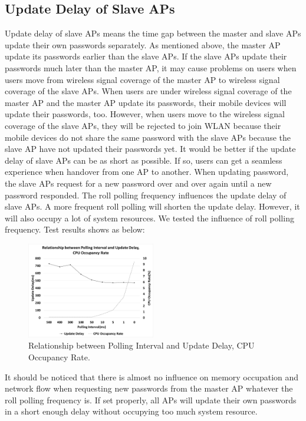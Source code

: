 \subsection{Update Delay of Slave APs}
Update delay of slave APs means the time gap between the master and slave APs update their own passwords separately. As mentioned above, the master AP update its passwords earlier than the slave APs. If the slave APs update their passwords much later than the master AP, it may cause problems on users when users move from wireless signal coverage of the master AP to wireless signal coverage of the slave APs. When users are under wireless signal coverage of the master AP and the master AP update its passwords, their mobile devices will update their passwords, too. However, when users move to the wireless signal coverage of the slave APs, they will be rejected to join WLAN because their mobile devices do not share the same password with the slave APs because the slave AP have not updated their passwords yet. It would be better if the update delay of slave APs can be as short as possible. If so, users can get a seamless experience when handover from one AP to another. When updating password, the slave APs request for a new password over and over again until a new password responded. The roll polling frequency influences the update delay of slave APs. A more frequent roll polling will shorten the update delay. However, it will also occupy a lot of system resources. We tested the influence of roll polling frequency. Test results shows as below: 


\begin{figure}
    \centering
    \includegraphics[width=0.5\textwidth]{pic/4.pdf}
    \caption{Relationship between Polling Interval and Update Delay, CPU Occupancy Rate.}
    \label{fig:exp2}
\end{figure}

It should be noticed that there is almost no influence on memory occupation and network flow when requesting new passwords from the master AP whatever the roll polling frequency is. If set properly, all APs will update their own passwords in a short enough delay without occupying too much system resource. 
